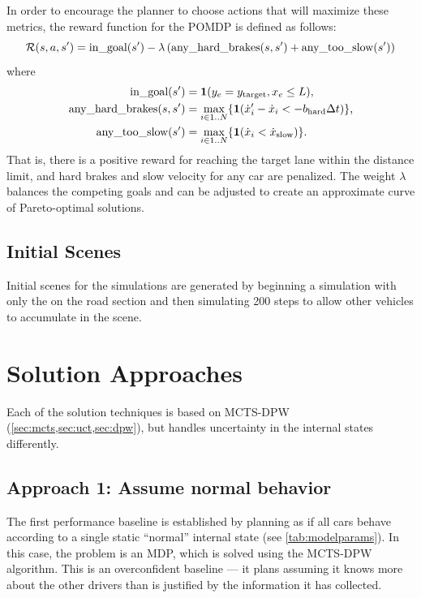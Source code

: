 In order to encourage the planner to choose actions that will maximize these metrics, the reward function for the POMDP is defined as follows: 
\begin{equation} \label{eqn:reward}
    \mathcal{R}(s, a, s') = \text{in\_goal}(s') - \lambda \left(\text{any\_hard\_brakes}(s, s') + \text{any\_too\_slow}(s')\right)
\end{equation}
where
\begin{align}
    \text{in\_goal}(s') &= \mathbf{1}({y}_e = y_\text{target}, {x}_e \leq L) \text{,}\\
    \text{any\_hard\_brakes}(s,s') &= \max_{i \in 1..N}\{\mathbf{1}({\dot{x}}_i' - {\dot{x}}_i < -b_\text{hard} \Delta t) \} \text{,}\\
    \text{any\_too\_slow}(s') &= \max_{i \in 1..N} \{\mathbf{1}({\dot{x}}_i < \dot{x}_\text{slow})\} \text{.}
\end{align}
That is, there is a positive reward for reaching the target lane within the distance limit, and hard brakes and slow velocity for any car are penalized.
The weight $\lambda$ balances the competing goals and can be adjusted to create an approximate curve of Pareto-optimal solutions.

\subsection{Initial Scenes} \label{sec:initial}

Initial scenes for the simulations are generated by beginning a simulation with only the \av{} on the road section and then simulating 200 steps to allow other vehicles to accumulate in the scene.

\section{Solution Approaches}

Each of the solution techniques is based on MCTS-DPW (\cref{sec:mcts,sec:uct,sec:dpw}), but handles uncertainty in the internal states differently.

\subsection{Approach 1: Assume normal behavior}

The first performance baseline is established by planning as if all cars behave according to a single static ``normal'' internal state (see \cref{tab:modelparams}).
In this case, the problem is an MDP, which is solved using the MCTS-DPW algorithm.
This is an overconfident baseline --- it plans assuming it knows more about the other drivers than is justified by the information it has collected.

